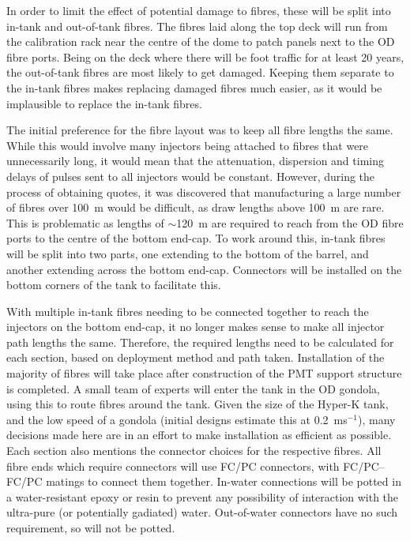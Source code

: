 \documentclass[a4paper,11pt]{article}
\let\oldsim\sim
\renewcommand{\sim}{{\oldsim}}
\begin{document}
In order to limit the effect of potential damage to fibres, these will be split into in-tank and out-of-tank fibres. The fibres laid along the top deck will run from the calibration rack near the centre of the dome to patch panels next to the OD fibre ports. Being on the deck where there will be foot traffic for at least 20 years, the out-of-tank fibres are most likely to get damaged. Keeping them separate to the in-tank fibres makes replacing damaged fibres much easier, as it would be implausible to replace the in-tank fibres.

The initial preference for the fibre layout was to keep all fibre lengths the same. While this would involve many injectors being attached to fibres that were unnecessarily long, it would mean that the attenuation, dispersion and timing delays of pulses sent to all injectors would be constant. However, during the process of obtaining quotes, it was discovered that manufacturing a large number of fibres over 100~m would be difficult, as draw lengths above 100~m are rare. This is problematic as lengths of $\sim$120~m are required to reach from the OD fibre ports to the centre of the bottom end-cap. To work around this, in-tank fibres will be split into two parts, one extending to the bottom of the barrel, and another extending across the bottom end-cap. Connectors will be installed on the bottom corners of the tank to facilitate this.

With multiple in-tank fibres needing to be connected together to reach the injectors on the bottom end-cap, it no longer makes sense to make all injector path lengths the same. Therefore, the required lengths need to be calculated for each section, based on deployment method and path taken. Installation of the majority of fibres will take place after construction of the PMT support structure is completed. A small team of experts will enter the tank in the OD gondola, using this to route fibres around the tank. Given the size of the Hyper-K tank, and the low speed of a gondola (initial designs estimate this at 0.2~ms$^{-1}$), many decisions made here are in an effort to make installation as efficient as possible. Each section also mentions the connector choices for the respective fibres. All fibre ends which require connectors will use FC/PC connectors, with FC/PC--FC/PC matings to connect them together. In-water connections will be potted in a water-resistant epoxy or resin to prevent any possibility of interaction with the ultra-pure (or potentially gadiated) water. Out-of-water connectors have no such requirement, so will not be potted.
\end{document}
